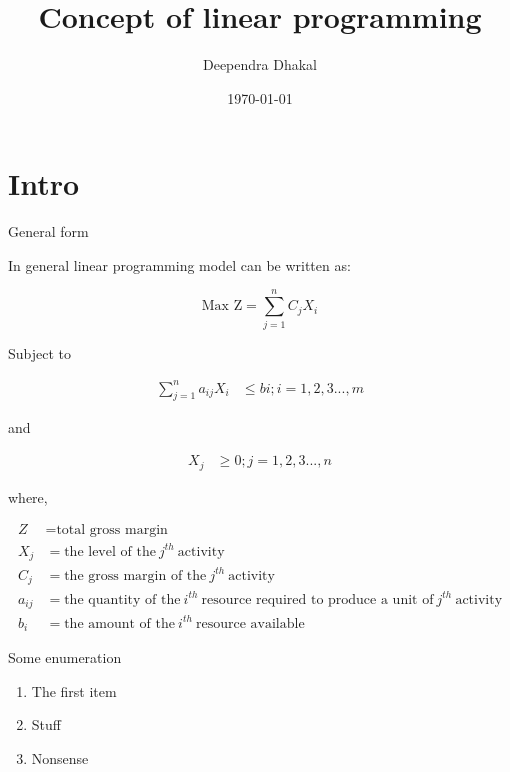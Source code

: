 \documentclass[14pt,ignorenonframetext,compress]{beamer}
\title[]{Concept of linear programming}
\author[
        Deependra Dhakal
    ]{Deependra Dhakal}
\date[
      \today
  ]{
      \today
        }
\providecommand{\tightlist}{%
  \setlength{\itemsep}{0pt}\setlength{\parskip}{0pt}}
\begin{document}
  \begin{frame}[plain]
  \titlepage
  \end{frame}



\hypertarget{intro}{%
\section{Intro}\label{intro}}

\begin{frame}{General form}
\protect\hypertarget{general-form}{}

In general linear programming model can be written as:

\[
\text{Max Z} = \sum_{j=1}^{n}{C_jX_i}
\tag{1.0}
\]

Subject to

\[
\begin{align}
\sum_{j=1}^{n}{a_{ij}X_i} &\leq bi ; i = 1,2,3...,m
\tag{1.1}
\end{align}
\]

and

\[
\begin{align}
X_j &\geq 0; j = 1, 2, 3...,n
\tag{1.2}
\end{align}
\]

where,

\[
\begin{align}
Z &= \text{total gross margin} \\
X_j &= \text{the level of the}\ j^{th}\ \text{activity} \\
C_j &= \text{the gross margin of the}\ j^{th}\ \text{activity} \\
a_{ij} &= \text{the quantity of the}\ i^{th}\ \text{resource required to produce a unit of}\ j^{th}\ \text{activity} \\
b_i &= \text{the amount of the}\ i^{th}\ \text{resource available}
\end{align}
\]

\begin{block}{Some enumeration}

\begin{enumerate}
\tightlist
\item
  The first item
\item
  Stuff
\item
  Nonsense
\end{enumerate}

\end{block}

\end{frame}
\end{document}
